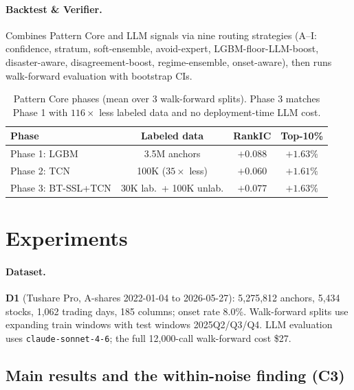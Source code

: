 \documentclass[sigconf,nonacm]{acmart}
\newcommand{\mt}[1]{\texttt{#1}}
\begin{document}
\paragraph{Backtest \& Verifier.} Combines Pattern Core and LLM signals via nine
routing strategies (A--I: confidence, stratum, soft-ensemble, avoid-expert,
LGBM-floor-LLM-boost, disaster-aware, disagreement-boost, regime-ensemble,
onset-aware), then runs walk-forward evaluation with bootstrap CIs.

\begin{table}[t]
\centering\small
\caption{Pattern Core phases (mean over 3 walk-forward splits). Phase 3 matches
Phase 1 with $116\times$ less labeled data and no deployment-time LLM cost.}
\label{tab:pattern}
\begin{tabular}{lccc}
\toprule
Phase & Labeled data & RankIC & Top-10\% \\
\midrule
Phase 1: LGBM & 3.5M anchors & $+0.088$ & $+1.63\%$ \\
Phase 2: TCN & 100K ($35\times$ less) & $+0.060$ & $+1.61\%$ \\
Phase 3: BT-SSL+TCN & 30K lab.\ + 100K unlab. & $+0.077$ & $+1.63\%$ \\
\bottomrule
\end{tabular}
\end{table}

\section{Experiments}\label{sec:exp}

\paragraph{Dataset.} \textbf{D1} (Tushare Pro, A-shares 2022-01-04 to 2026-05-27):
5{,}275{,}812 anchors, 5{,}434 stocks, 1{,}062 trading days, 185 columns; onset rate
8.0\%. Walk-forward splits use expanding train windows with test windows 2025Q2/Q3/Q4.
LLM evaluation uses \mt{claude-sonnet-4-6}; the full 12{,}000-call walk-forward cost
\$27.

\subsection{Main results and the within-noise finding (C3)}\label{sec:noise}
\end{document}

